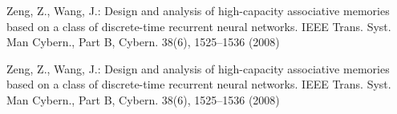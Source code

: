\begin{thebibliography}{20}

Zeng, Z., Wang, J.: Design and analysis of high-capacity associative memories based on a class of discrete-time
recurrent neural networks. IEEE Trans. Syst. Man Cybern., Part B, Cybern. 38(6), 1525–1536 (2008)

Zeng, Z., Wang, J.: Design and analysis of high-capacity associative memories based on a class of discrete-time
recurrent neural networks. IEEE Trans. Syst. Man Cybern., Part B, Cybern. 38(6), 1525–1536 (2008)

\end{thebibliography}
